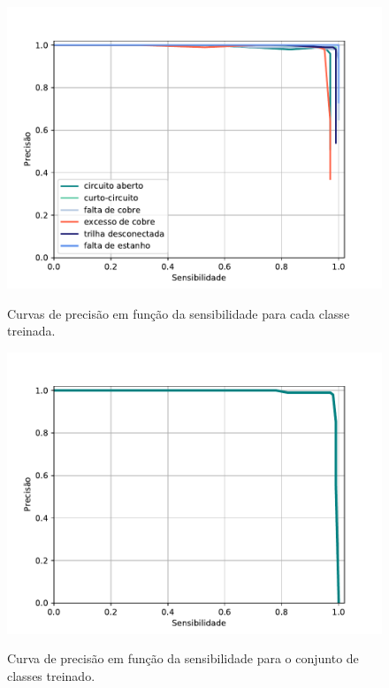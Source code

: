\begin{figure}[H] %
  \centering
  \caption{Curvas de precisão em função da sensibilidade para cada classe treinada.}
  \includegraphics[scale=0.8]{img/img-resultados-pr.pdf}
  \label{fig:resultados-pr}
\end{figure}

\begin{figure}[H] %
  \centering
  \caption{Curva de precisão em função da sensibilidade para o conjunto de classes treinado.}
  \includegraphics[scale=0.8]{img/img-resultados-pr-total.pdf}
  \label{fig:resultados-pr-total}
\end{figure}

